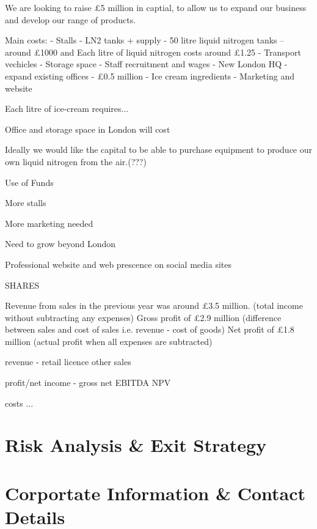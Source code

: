\documentclass{article}
\begin{document}
We are looking to raise £5 million in captial, to allow us to expand our business and develop our range of products.

Main costs:
 - Stalls - LN2 tanks + supply - 50 litre liquid nitrogen tanks – around £1000 and Each litre of liquid nitrogen costs around £1.25
 - Transport vechicles
 - Storage space
 - Staff recruitment and wages
 - New London HQ - expand existing offices - £0.5 million
 - Ice cream ingredients
 - Marketing and website




Each litre of ice-cream requires...

Office and storage space in London will cost

Ideally we would like the capital to be able to purchase equipment to
produce our own liquid nitrogen from the air.(???)

Use of Funds

More stalls

More marketing needed

Need to grow beyond London

Professional website and web prescence on social media sites


SHARES

Revenue from sales in the previous year was around £3.5 million. (total income without subtracting any expenses) 
Gross profit of £2.9 million (difference between sales and cost of sales i.e. revenue - cost of goods)
Net profit of £1.8 million (actual profit when all expenses are subtracted)



revenue
 - retail
   licence
   other sales

profit/net income
 - gross
   net
   EBITDA
   NPV

costs
 ...

\section{Risk Analysis \& Exit Strategy}



\section{Corportate Information \& Contact Details}
\end{document}
